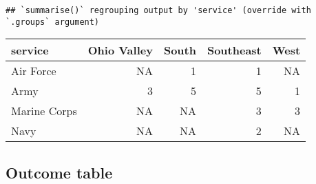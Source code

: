 \documentclass[
]{article}
\begin{document}
\begin{verbatim}
## `summarise()` regrouping output by 'service' (override with `.groups` argument)
\end{verbatim}

\begin{longtable}[]{@{}lrrrr@{}}
\toprule
service & Ohio Valley & South & Southeast & West\tabularnewline
\midrule
\endhead
Air Force & NA & 1 & 1 & NA\tabularnewline
Army & 3 & 5 & 5 & 1\tabularnewline
Marine Corps & NA & NA & 3 & 3\tabularnewline
Navy & NA & NA & 2 & NA\tabularnewline
\bottomrule
\end{longtable}

\hypertarget{outcome-table}{%
\subsection{Outcome table}\label{outcome-table}}
\end{document}
